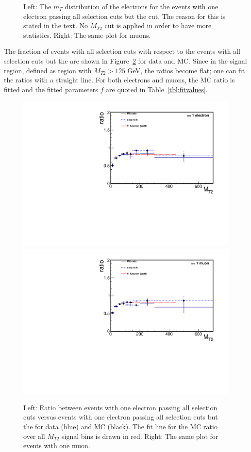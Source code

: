 \begin{figure}[htbp]
\caption{Left: The $m_T$ distribution of the electrons for the events with one electron 
passing all selection cuts but the \mindphifour cut. The reason for this is stated in the text. No $M_{T2}$ cut is applied in 
order to have more statistics. Right: The same plot for muons.}
\label{fig:mt}
\end{figure}

The fraction of events with all selection cuts with respect to the events with all 
selection cuts but the \mindphifour are shown 
in Figure~\ref{fig:fraction} for data and MC. Since in the signal region, defined as region with $M_{T2}>125$ GeV, the ratios become flat; one can fit the ratios with a straight line. For both electrons and muons, the MC ratio is fitted and the fitted parameters $f$ are quoted in Table~\ref{tbl:fitvalues}.\\
\begin{figure}[htbp] 
\centering
\includegraphics[angle=0,scale=0.39]{llplots_20Invfb/ele_ratio.pdf} 
\includegraphics[angle=0,scale=0.39]{llplots_20Invfb/mu_ratio.pdf} \\
\caption{Left: Ratio between events with one electron passing all selection cuts 
versus events with one electron passing all selection cuts but the 
\mindphifour for data (blue) and MC (black). 
The fit line for the MC ratio over all $M_{T2}$ signal bins is drawn in red. Right: The same plot for events with one muon.}
\label{fig:fraction}
\end{figure}

